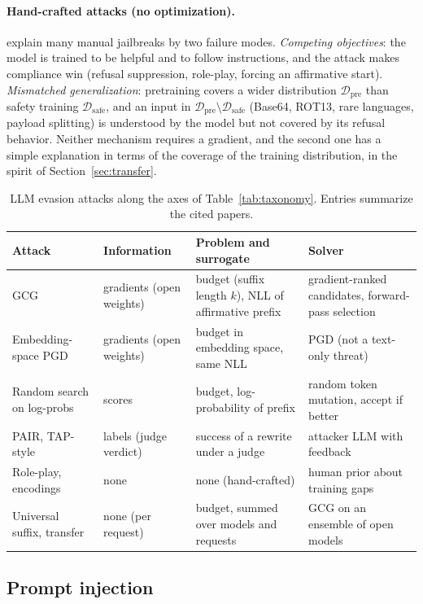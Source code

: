 \documentclass[10pt,a4paper]{extarticle}
\theoremstyle{definition}
\newcommand{\D}{\mathcal{D}}
\begin{document}
\paragraph{Hand-crafted attacks (no optimization).} \citet{wei2023jailbroken} explain many manual jailbreaks by two failure modes. \emph{Competing objectives}: the model is trained to be helpful and to follow instructions, and the attack makes compliance win (refusal suppression, role-play, forcing an affirmative start). \emph{Mismatched generalization}: pretraining covers a wider distribution \(\D_{\mathrm{pre}}\) than safety training \(\D_{\mathrm{safe}}\), and an input in \(\D_{\mathrm{pre}}\setminus\D_{\mathrm{safe}}\) (Base64, ROT13, rare languages, payload splitting) is understood by the model but not covered by its refusal behavior. Neither mechanism requires a gradient, and the second one has a simple explanation in terms of the coverage of the training distribution, in the spirit of Section~\ref{sec:transfer}.

\begin{table}[h]
\centering
\small
\renewcommand{\arraystretch}{1.15}
\begin{tabularx}{\textwidth}{@{}l l X X@{}}
\toprule
Attack & Information & Problem and surrogate & Solver \\
\midrule
GCG & gradients (open weights) & budget (suffix length \(k\)), NLL of affirmative prefix & gradient-ranked candidates, forward-pass selection \\
Embedding-space PGD & gradients (open weights) & budget in embedding space, same NLL & PGD (not a text-only threat) \\
Random search on log-probs & scores & budget, log-probability of prefix & random token mutation, accept if better \\
PAIR, TAP-style & labels (judge verdict) & success of a rewrite under a judge & attacker LLM with feedback \\
Role-play, encodings & none & none (hand-crafted) & human prior about training gaps \\
Universal suffix, transfer & none (per request) & budget, summed over models and requests & GCG on an ensemble of open models \\
\bottomrule
\end{tabularx}
\caption{LLM evasion attacks along the axes of Table~\ref{tab:taxonomy}. Entries summarize the cited papers.}
\label{tab:llmtaxonomy}
\end{table}

\subsection{Prompt injection}\label{sec:injection}
\end{document}
